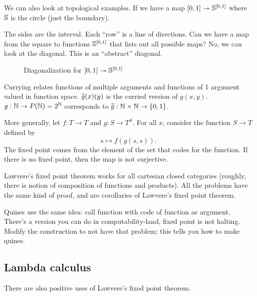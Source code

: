 \documentclass[11pt]{article}
\begin{document}
We can also look at topological examples. If we have a map $[0,1]\twoheadrightarrow \mathbb{S}^{[0,1]}$ where $\mathbb{S}$ is the circle (just the boundary).

The sides are the interval. Each ``row''  is a line of directions. Can we have a map from the square to functions $\mathbb{S}^{[0,1]}$ that lists out all possible maps? No, we can look at the diagonal. This is an ``abstract'' diagonal.

\begin{figure}
\caption{Diagonalization for $[0,1]\twoheadrightarrow \mathbb{S}^{[0,1]}$}
\end{figure}



Currying relates functions of multiple arguments and functions of 1 argument valued in function space. $\widetilde{g}(x)(y)$ is the curried version of $g(x,y)$. $g:\mathbb{N} \to P(\mathbb{N})=2^{\mathbb{N}}$ corresponds to $\widetilde{g}:\mathbb{N}\times \mathbb{N} \to \{0,1\}$.

More generally, let $f:T\to T$ and $g:S\to T^S$. For all $x$, consider the function $S\to T$ defined by
$$
s\mapsto f(g(s,s)).
$$
The fixed point comes from the element of the set that codes for the function. If there is no fixed point, then the map is not surjective.

Lawvere's fixed point theorem works for all cartesian closed categories (roughly, there is notion of composition of functions and products). %
All the problems have the same kind of proof, and are corollaries of Lawvere's fixed point theorem.


Quines use the same idea: call function with code of function as argument. There's a version you can do in computability-land, fixed point is not halting. Modify the construction to not have that problem; this tells you how to make quines.


\subsection{Lambda calculus}
There are also positive uses of Lawvere's fixed point theorem.
\end{document}
